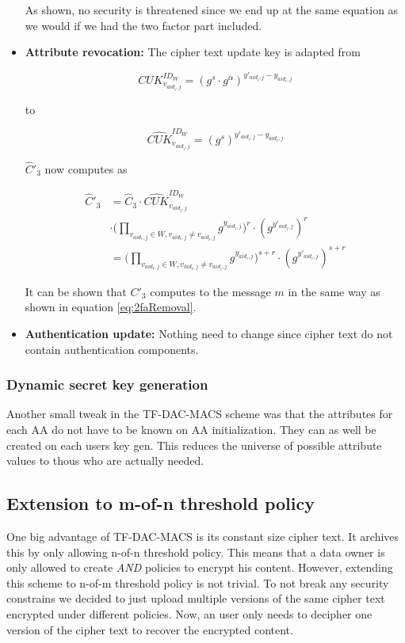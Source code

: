 \begin{itemize}
As shown, no security is threatened since we end up at the same equation as we would if we had the two factor part included. 

\item \textbf{Attribute revocation:}
The cipher text update key is adapted from

$$
CUK^{ID_W}_{v_{aid_i,j}} = (g^s \cdotp g^\alpha)^{y'_{aid_i,j} - y_{aid_i,j}}
$$

to 

$$
\widehat{CUK}^{ID_W}_{v_{aid_i,j}} = (g^s)^{y'_{aid_i,j} - y_{aid_i,j}}
$$

$\widehat{C}'_3$ now computes as 

\begin{equation}
\begin{split}
\widehat{C}'_3 &= \widehat{C}_3 \cdotp \widehat{CUK}^{ID_W}_{v_{aid_i,j}} \\
&\cdotp \Big( \prod_{v_{aid_{t}, j}\in W, v_{aid_t, j} \neq v_{aid_i,j}} g^{y_{aid_{i}, j}} \Big)^{r} \cdotp (g^{y'_{aid_i,j}})^{r} \\
&= \Big( \prod_{v_{aid_{t}, j}\in W, v_{aid_t, j} \neq v_{aid_i,j}} g^{y_{aid_{i}, j}} \Big)^{s + r} \cdotp (g^{y'_{aid_i,j}})^{s + r}
\end{split}
\end{equation}

It can be shown that $C'_3$ computes to the message $m$ in the same way as shown in equation \ref{eq:2faRemoval}.

\item \textbf{Authentication update:}
Nothing need to change since cipher text do not contain authentication components. 
\end{itemize}

\subsubsection{Dynamic secret key generation}
Another small tweak in the \ac{TF-DAC-MACS} scheme was that the attributes for each \ac{AA} do not have to be known on AA initialization. They can as well be created on each users key gen. This reduces the universe of possible attribute values to thous who are actually needed.

\subsection{Extension to m-of-n threshold policy}
One big advantage of TF-DAC-MACS is its constant size cipher text. It archives this by only allowing n-of-n threshold policy. This means that a data owner is only allowed to create \textit{AND} policies to encrypt his content. However, extending this scheme to n-of-m threshold policy is not trivial. To not break any security constrains we decided to just upload multiple versions of the same cipher text encrypted under different policies. Now, an user only needs to decipher one version of the cipher text to recover the encrypted content. 


